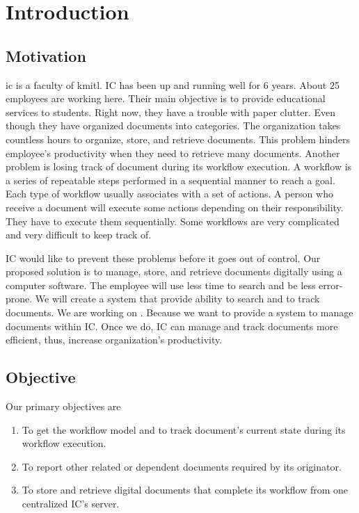 \chapter{Introduction}

\section{Motivation}
\gls{ic} is a faculty of \gls{kmitl}. 
IC has been up and running well for 6 years.
About 25 employees are working here. %
Their main objective is to provide educational services to students. 
Right now, they have a trouble with paper clutter. 
Even though they have organized documents into categories. 
The organization takes countless hours to organize, store, and retrieve documents.
This problem hinders employee's productivity when they need to retrieve many documents. 
Another problem is losing track of document during its workflow execution. 
A workflow is a series of repeatable steps performed in a sequential manner to reach a goal.
Each type of workflow usually associates with a set of actions. 
A person who receive a document will execute some actions depending on their responsibility.
They have to execute them sequentially. 
Some workflows are very complicated and very difficult to keep track of.

IC would like to prevent these problems before it goes out of control. 
Our proposed solution is to manage, store, and retrieve documents digitally using a computer software.
The employee will use less time to search and be less error-prone.
We will create a system that provide ability to search and to track documents.
We are working on \dms.
Because we want to provide a system to manage documents within IC.
Once we do, IC can manage and track documents more efficient, thus, increase organization's productivity.

\section{Objective}
Our primary objectives are
\begin{enumerate}
\item To get the workflow model and to track document's current state during its workflow execution. 
\item To report other related or dependent documents required by its originator.
\item To store and retrieve digital documents that complete its workflow from one centralized IC's server.
\end{enumerate}


